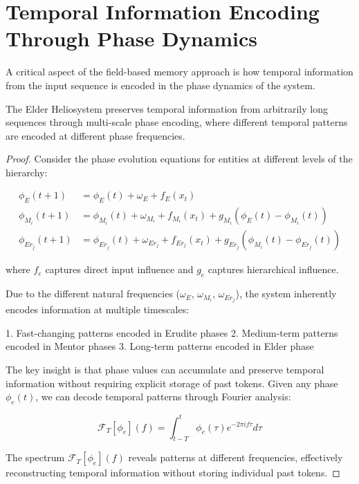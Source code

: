 \section{Temporal Information Encoding Through Phase Dynamics}

A critical aspect of the field-based memory approach is how temporal information from the input sequence is encoded in the phase dynamics of the system.

\begin{theorem}
The Elder Heliosystem preserves temporal information from arbitrarily long sequences through multi-scale phase encoding, where different temporal patterns are encoded at different phase frequencies.
\end{theorem}

\begin{proof}
Consider the phase evolution equations for entities at different levels of the hierarchy:

\begin{align}
\phi_E(t+1) &= \phi_E(t) + \omega_E + f_E(x_t) \\
\phi_{M_i}(t+1) &= \phi_{M_i}(t) + \omega_{M_i} + f_{M_i}(x_t) + g_{M_i}(\phi_E(t) - \phi_{M_i}(t)) \\
\phi_{Er_j}(t+1) &= \phi_{Er_j}(t) + \omega_{Er_j} + f_{Er_j}(x_t) + g_{Er_j}(\phi_{M_i}(t) - \phi_{Er_j}(t))
\end{align}

where $f_e$ captures direct input influence and $g_e$ captures hierarchical influence.

Due to the different natural frequencies ($\omega_E$, $\omega_{M_i}$, $\omega_{Er_j}$), the system inherently encodes information at multiple timescales:

1. Fast-changing patterns encoded in Erudite phases
2. Medium-term patterns encoded in Mentor phases
3. Long-term patterns encoded in Elder phase

The key insight is that phase values can accumulate and preserve temporal information without requiring explicit storage of past tokens. Given any phase $\phi_e(t)$, we can decode temporal patterns through Fourier analysis:

\begin{equation}
\mathcal{F}_T[\phi_e](f) = \int_{t-T}^{t} \phi_e(\tau) e^{-2\pi i f \tau} d\tau
\end{equation}

The spectrum $\mathcal{F}_T[\phi_e](f)$ reveals patterns at different frequencies, effectively reconstructing temporal information without storing individual past tokens.


\end{proof}
